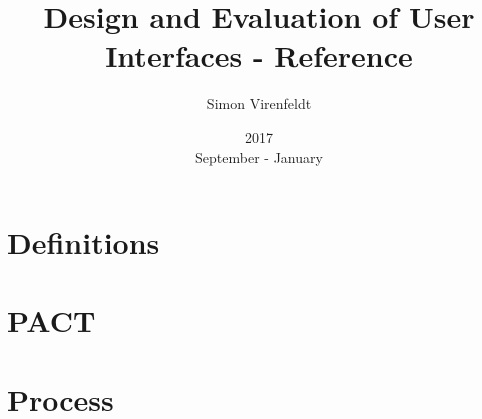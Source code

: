 \documentclass[10pt,a4paper,oneside,twocolumn]{article}
\author{Simon Virenfeldt}
\title{Design and Evaluation of User Interfaces - Reference}
\date{2017\\September - January}
\begin{document}
    \maketitle
	\section{Definitions}
	
	\section{PACT}
	
	\section{Process}
	
\end{document}
